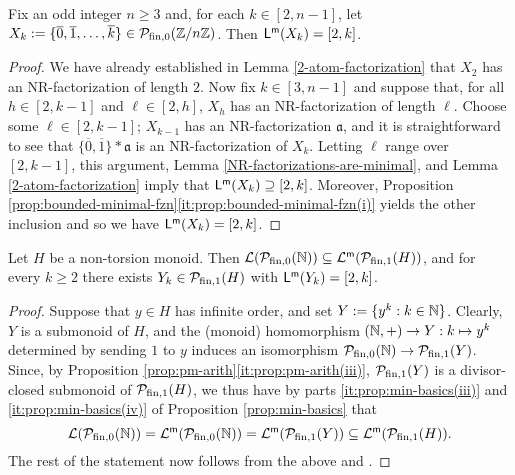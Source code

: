 \begin{lemma}\label{lem:interval-minimal-length-sets}
Fix an odd integer $n\ge 3$ and, for each $k\in [2,n-1]$, let $X_k := \{\overline{0},\overline{1}, \dots, \overline{k} \} \in  \mathcal{P}_{\textrm{fin},0}(\mathbb{Z}/n\mathbb{Z})$.
Then $\mathsf{L}^{\mathsf{m}}(X_k) = [ 2,k ]$.
\end{lemma}

\begin{proof}
We have already established in Lemma \ref{2-atom-factorization} that $X_2$ has an NR-factorization of length $2$.
Now fix $k \in [ 3, n-1 ]$ and suppose that, for all $h \in [ 2, k-1 ]$ and $\ell \in [ 2,h ]$, $X_h$ has an NR-factorization of length $\ell$.
Choose some $\ell \in [ 2,k-1 ]$; $X_{k-1}$ has an NR-factorization $\mathfrak{a}$, and it is straightforward to see that $\{\overline{0},\overline{1}\}*\mathfrak{a}$ is an NR-factorization of $X_k$.
Letting $\ell$ range over $[ 2,k-1]$, this argument, Lemma \ref{NR-factorizations-are-minimal}, and Lemma \ref{2-atom-factorization} imply that $\mathsf{L}^{\mathsf{m}}(X_k) \supseteq [ 2, k ]$.
Moreover, Proposition \ref{prop:bounded-minimal-fzn}\ref{it:prop:bounded-minimal-fzn(i)} yields the other inclusion and so we have  $\mathsf{L}^{\mathsf{m}}(X_k) = [ 2,k ]$.
\end{proof}


\begin{lemma}\label{prop:intervals-in-N}
Let $H$ be a non-torsion monoid.
Then $\mathcal{L}(\mathcal{P}_{\textrm{fin},0}(\mathbb{N})) \subseteq \mathcal{L}^{\mathsf{m}}(\mathcal{P}_{\textrm{fin}, 1}(H))$, and for every $k\ge 2$ there exists $Y_k\in \mathcal{P}_{\textrm{fin}, 1}(H)$ with $\mathsf{L}^{\mathsf{m}}(Y_k) = [ 2, k ]$.
\end{lemma}

\begin{proof}
Suppose that $y\in H$ has infinite order, and set $Y := \{y^k: k \in \mathbb{N}\}$. Clearly, $Y$ is a submonoid of $H$, and the (monoid) homomorphism $(\mathbb{N},+) \to Y: k \mapsto y^k$ determined by sending $1$ to $y$ induces an iso\-morphism $\mathcal{P}_{\textrm{fin},0}(\mathbb{N}) \to \mathcal{P}_{\textrm{fin}, 1}(Y)$.
Since, by Proposition \ref{prop:pm-arith}\ref{it:prop:pm-arith(iii)}, $\mathcal{P}_{\textrm{fin}, 1}(Y)$ is a divisor-closed submonoid of $\mathcal{P}_{\textrm{fin}, 1}(H)$, we thus have by parts \ref{it:prop:min-basics(iii)} and \ref{it:prop:min-basics(iv)} of Proposition \ref{prop:min-basics} that
\[
\mathcal{L}(\mathcal{P}_{\textrm{fin},0}(\mathbb{N})) = \mathcal{L}^{\mathsf{m}}(\mathcal{P}_{\textrm{fin},0}(\mathbb{N})) = \mathcal{L}^{\mathsf{m}}(\mathcal{P}_{\textrm{fin}, 1}(Y)) \subseteq \mathcal{L}^{\mathsf{m}}(\mathcal{P}_{\textrm{fin}, 1}(H)).
\]
The rest of the statement now follows from the above and \cite[Proposition 4.8]{fan-tringali18}.
\end{proof}




